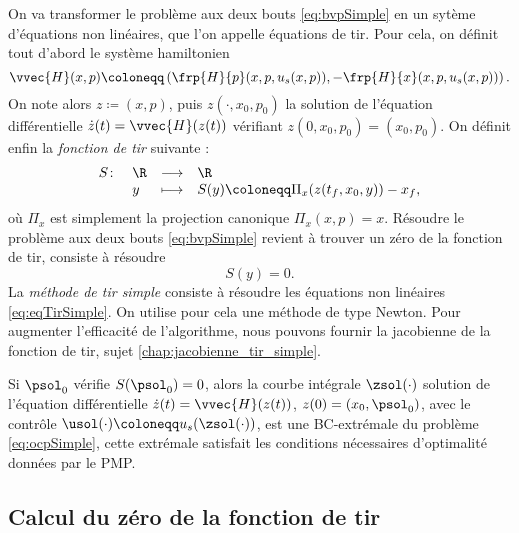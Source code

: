     On va transformer le probl\`eme aux deux bouts \eqref{eq:bvpSimple} en un syt\`eme d'\'equations non lin\'eaires, que l'on appelle \'equations de tir.
    Pour cela, on d\'efinit tout d'abord le syst\`eme hamiltonien 
    \begin{equation}
        \vvec{H}(x,p) \coloneqq \left( \frp{H}{p}(x,p,u_s(x,p)), -\frp{H}{x}(x,p,u_s(x,p)) \right).
        \label{eq:sysHamTirSimple}
    \end{equation}
    On note alors $z \coloneqq (x,p)$, puis $z(\cdot,x_0,p_0)$ la solution de l'\'equation diff\'erentielle $\dot{z}(t) = \vvec{H}(z(t))$
    v\'erifiant $z(0,x_0,p_0) = (x_0,p_0)$.
    On d\'efinit enfin la \emph{fonction de tir} suivante :
    \begin{equation}
        \begin{array}{rlll}
            S \colon    & \R    & \longrightarrow   & \R \\
                        & y     & \longmapsto       & S(y) \coloneqq \Pi_x(z(t_f,x_0,y)) - x_f,
        \end{array}
        \label{eq:fonctionDeTirSimple}
    \end{equation}
    o\`u $\Pi_x$ est simplement la projection canonique $\Pi_x(x,p) = x$.
    R\'esoudre le probl\`eme aux deux bouts \eqref{eq:bvpSimple} revient \`a trouver un z\'ero de la fonction de tir, 
    \ie consiste \`a r\'esoudre
    \begin{equation}
        S(y) = 0.
        \label{eq:eqTirSimple}
    \end{equation}
    La \emph{m\'ethode de tir simple} consiste \`a r\'esoudre les \'equations non lin\'eaires \eqref{eq:eqTirSimple}. On utilise pour cela une m\'ethode 
    de type Newton. Pour augmenter l'efficacit\'e de l'algorithme, nous pouvons fournir la jacobienne de la fonction de tir,
    \cf sujet \ref{chap:jacobienne_tir_simple}.

    \begin{myremark}
        \anoter
        Si $\psol_0$ v\'erifie $S(\psol_0)=0$, alors 
        la courbe int\'egrale $\zsol(\cdot)$ solution de l'\'equation diff\'erentielle $\dot{z}(t) = \vvec{H}(z(t))$, $z(0) = (x_0,\psol_0)$,
        avec le contr\^ole $\usol(\cdot) \coloneqq u_s(\zsol(\cdot))$,
        est une BC-extr\'emale du probl\`eme \eqref{eq:ocpSimple}, \ie cette extr\'emale satisfait les conditions n\'ecessaires d'optimalit\'e
        donn\'ees par le PMP.
    \end{myremark}

\subsection{Calcul du z\'ero de la fonction de tir}

